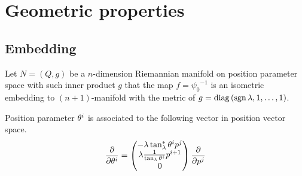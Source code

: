 \documentclass[../main.tex]{subfiles}
\begin{document}
\section{Geometric properties}
\subsection{Embedding}
\begin{definition}\label{M:Embedding}
Let \(N=\left(Q,g\right)\) be a \(n\)-dimension Riemannian manifold
on position parameter space with such inner product \(g\) that
the map \(f={\psi_0}^{-1}\)
is an isometric embedding to \(\left(n+1\right)\)-manifold
with the metric of \(g=\operatorname{diag}{\left(\operatorname{sgn}{\lambda},1,\dots,1\right)}\).
\end{definition}
\begin{lemma}\label{M:Tangent:Basis}
Position parameter \(\tensor{\theta}{^i}\) is associated to the following vector in position vector space.
\[
\frac{\partial}{\partial\tensor{\theta}{^i}}=
\begin{pmatrix}
-\lambda\tan_\lambda^\ast\tensor{\theta}{^i}\tensor{p}{^j}\\
\lambda\frac{1}{\tan_\lambda\tensor{\theta}{^i}}\tensor{p}{^{i+1}}\\
0
\end{pmatrix}\frac{\partial}{\partial\tensor{p}{^j}}
\]
\end{lemma}
\end{document}
